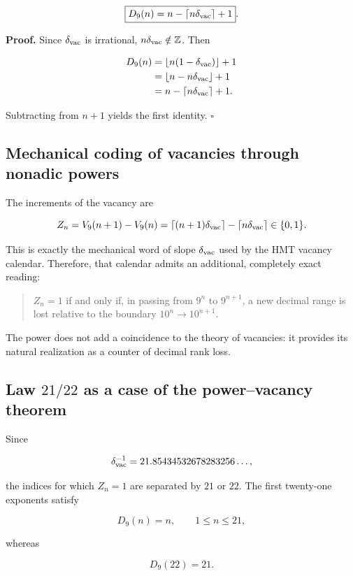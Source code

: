 \[
\boxed{D_9(n)=n-\left\lceil n\delta_{\rm vac}\right\rceil+1}.
\]

\textbf{Proof.} Since \(\delta_{\rm vac}\) is irrational, \(n\delta_{\rm vac}\notin\mathbb Z\). Then

\[
\begin{aligned}
D_9(n)
&=\lfloor n(1-\delta_{\rm vac})\rfloor+1\\
&=\lfloor n-n\delta_{\rm vac}\rfloor+1\\
&=n-\lceil n\delta_{\rm vac}\rceil+1.
\end{aligned}
\]

Subtracting from \(n+1\) yields the first identity. \(\square\)

\subsection{Mechanical coding of vacancies through nonadic powers}

The increments of the vacancy are

\[
Z_n=V_9(n+1)-V_9(n)
=\lceil(n+1)\delta_{\rm vac}\rceil
-\lceil n\delta_{\rm vac}\rceil
\in\{0,1\}.
\]

This is exactly the mechanical word of slope \(\delta_{\rm vac}\) used by the HMT vacancy calendar. Therefore, that calendar admits an additional, completely exact reading:

\begin{quote}
\(Z_n=1\) if and only if, in passing from \(9^n\) to \(9^{n+1}\), a new decimal range is lost relative to the boundary \(10^n\to10^{n+1}\).
\end{quote}

The power does not add a coincidence to the theory of vacancies: it provides its natural realization as a counter of decimal rank loss.

\subsection{Law \(21/22\) as a case of the power--vacancy theorem}

Since

\[
\delta_{\rm vac}^{-1}
=21.85434532678283256\ldots,
\]

the indices for which \(Z_n=1\) are separated by \(21\) or \(22\). The first twenty-one exponents satisfy

\[
D_9(n)=n,\qquad1\le n\le21,
\]

whereas

\[
D_9(22)=21.
\]

